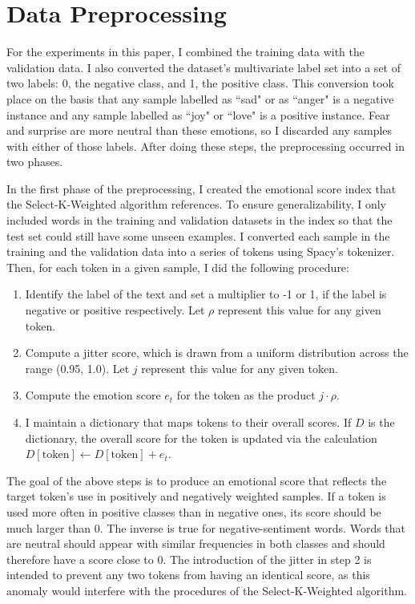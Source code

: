 \documentclass[11pt]{article}
\begin{document}
\section{Data Preprocessing}
For the experiments in this paper, I combined the training data with the validation data. I also converted the dataset's multivariate label set into a set of two labels: 0, the negative class, and 1, the positive class. This conversion took place on the basis that any sample labelled as ``sad" or as ``anger" is a negative instance and any sample labelled as ``joy" or ``love" is a positive instance. Fear and surprise are more neutral than these emotions, so I discarded any samples with either of those labels. After doing these steps, the preprocessing occurred in two phases. 

In the first phase of the preprocessing, I created the emotional score index that the Select-K-Weighted algorithm references. To ensure generalizability, I only included words in the training and validation datasets in the index so that the test set could still have some unseen examples. I converted each sample in the training and the validation data into a series of tokens using Spacy's tokenizer. Then, for each token in a given sample, I did the following procedure:
\begin{enumerate}
    \item Identify the label of the text and set a multiplier to -1 or 1, if the label is negative or positive respectively. Let $\rho$ represent this value for any given token.
    \item Compute a jitter score, which is drawn from a uniform distribution across the range (0.95, 1.0). Let $j$ represent this value for any given token.
    \item Compute the emotion score $e_t$ for the token as the product $j\cdot \rho$.
    \item I maintain a dictionary that maps tokens to their overall scores. If $D$ is the dictionary, the overall score for the token is updated via the calculation $D[\text{token}] \leftarrow D[\text{token}] + e_t$.
\end{enumerate}

The goal of the above steps is to produce an emotional score that reflects the target token's use in positively and negatively weighted samples. If a token is used more often in positive classes than in negative ones, its score should be much larger than 0. The inverse is true for negative-sentiment words. Words that are neutral should appear with similar frequencies in both classes and should therefore have a score close to 0. The introduction of the jitter in step 2 is intended to prevent any two tokens from having an identical score, as this anomaly would interfere with the procedures of the Select-K-Weighted algorithm.
\end{document}
